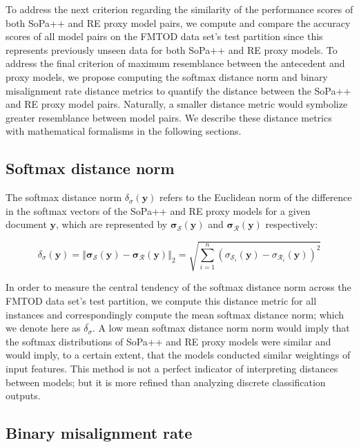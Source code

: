 To address the next criterion regarding the similarity of the performance scores
of both SoPa++ and RE proxy model pairs, we compute and compare the accuracy
scores of all model pairs on the FMTOD data set's test partition since this
represents previously unseen data for both SoPa++ and RE proxy models. To
address the final criterion of maximum resemblance between the antecedent and
proxy models, we propose computing the softmax distance norm and binary
misalignment rate distance metrics to quantify the distance between the SoPa++
and RE proxy model pairs. Naturally, a smaller distance metric would symbolize
greater resemblance between model pairs. We describe these distance metrics with
mathematical formalisms in the following sections.

\subsection{Softmax distance norm}

The softmax distance norm $\delta_{\sigma}(\bm{y})$ refers to the Euclidean norm
of the difference in the softmax vectors of the SoPa++ and RE proxy models for a
given document $\bm{y}$, which are represented by
$\bm{\sigma_{\mathcal{S}}}(\bm{y})$ and $\bm{\sigma_{\mathcal{R}}}(\bm{y})$
respectively:

\begin{equation}
  \delta_{\sigma}(\bm{y}) = \left\Vert \bm{\sigma_{\mathcal{S}}}(\bm{y}) - \bm{\sigma_{\mathcal{R}}}(\bm{y}) \right\Vert_{2} = \sqrt{\sum^n_{i=1} (\sigma_{\mathcal{S}_i}(\bm{y}) - \sigma_{\mathcal{R}_i}(\bm{y}))^2} 
\end{equation}

In order to measure the central tendency of the softmax distance norm across the
FMTOD data set's test partition, we compute this distance metric for all
instances and correspondingly compute the mean softmax distance norm; which we
denote here as $\overline{\delta_{\sigma}}$. A low mean softmax distance norm
norm would imply that the softmax distributions of SoPa++ and RE proxy models
were similar and would imply, to a certain extent, that the models conducted
similar weightings of input features. This method is not a perfect indicator of
interpreting distances between models; but it is more refined than analyzing
discrete classification outputs.

\subsection{Binary misalignment rate}

